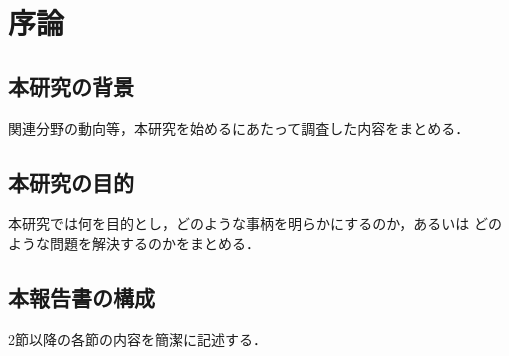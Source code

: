 \section{序論}\label{sec1}
\subsection{本研究の背景}
関連分野の動向等，本研究を始めるにあたって調査した内容をまとめる．

\subsection{本研究の目的}
本研究では何を目的とし，どのような事柄を明らかにするのか，あるいは
どのような問題を解決するのかをまとめる．

\subsection{本報告書の構成}
2節以降の各節の内容を簡潔に記述する．
